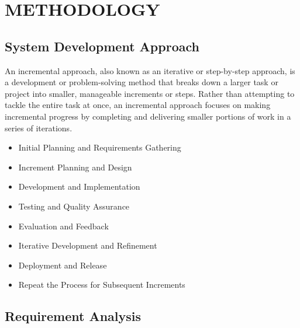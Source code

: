 \chapter{METHODOLOGY}
\section{System Development Approach}
An incremental approach, also known as an iterative or step-by-step approach, is a development or problem-solving method that breaks down a larger task or project into smaller, manageable increments or steps. Rather than attempting to tackle the entire task at once, an incremental approach focuses on making incremental progress by completing and delivering smaller portions of work in a series of iterations.
\begin{itemize}
    \setlength\itemsep{0.25em}
    \item Initial Planning and Requirements Gathering
    \item Increment Planning and Design
    \item Development and Implementation
    \item Testing and Quality Assurance
    \item Evaluation and Feedback
    \item Iterative Development and Refinement
    \item Deployment and Release
    \item Repeat the Process for Subsequent Increments
\end{itemize}
\section{Requirement Analysis}
